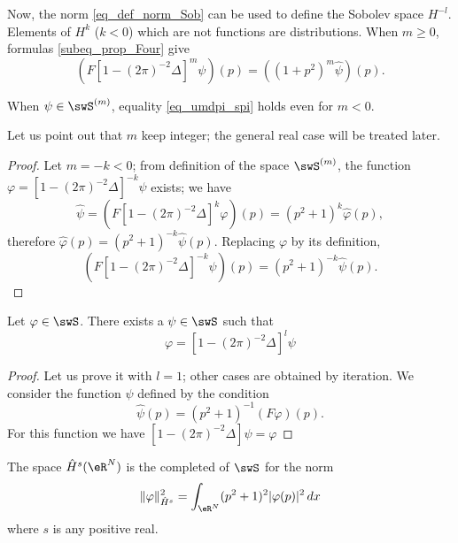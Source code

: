 Now, the norm \eqref{eq_def_norm_Sob} can be used to define the Sobolev space $H^{-l}$. Elements of $H^k$ ($k<0$) which are not functions are distributions. When $m\ge0$, formulas  \eqref{subeq_prop_Four} give
\begin{equation}  \label{eq_umdpi_spi}
\left( F[1-(2\pi)^{-2}\Delta]^m\psi \right)(p)=\left( (1+p^2)^m\hat\psi \right)(p).
\end{equation}

\begin{proposition}
When $\psi\in\swS^{(m)}$, equality  \eqref{eq_umdpi_spi} holds even for $m<0$. 
\end{proposition}


Let us point out that $m$ keep integer; the general real case will be treated later.

\begin{proof}
Let $m=-k<0$; from definition of the space $\swS^{(m)}$, the function $\varphi=[1-(2\pi)^{-2}\Delta]^{-k}\psi$ exists; we have
\begin{equation}
\hat\psi=\left( F[1-(2\pi)^{-2}\Delta]^k\varphi \right)(p)
	=(p^2+1)^k\hat\varphi(p),
\end{equation}
therefore $\hat\varphi(p)=(p^2+1)^{-k}\hat\psi(p)$. Replacing $\varphi$ by its definition,
\begin{equation}
\left( F[1-(2\pi)^{-2}\Delta]^{-k}\psi \right)(p)=(p^2+1)^{-k}\hat\psi(p).
\end{equation}


\end{proof}

\begin{proposition}
Let $\varphi\in\swS$. There exists a $\psi\in\swS$ such that 
\[ 
  \varphi=[1-(2\pi)^{-2}\Delta]^l\psi
\]

\end{proposition}

\begin{proof}
Let us prove it with $l=1$; other cases are obtained by iteration. We consider the function $\psi$ defined by the condition
\[ 
  \hat\psi(p)=(p^2+1)^{-1}(F\varphi)(p).
\]
For this function we have $[1-(2\pi)^{-2}\Delta]\psi=\varphi$
\end{proof}

The space $\hat H^s(\eR^N)$ is the completed of $\swS$ for the norm
\begin{equation}
\| \varphi \|^2_{\hat H^s}=\int_{\eR^N}(p^2+1)^2| \varphi(p) |^2\,dx
\end{equation}
where $s$ is any positive real.



